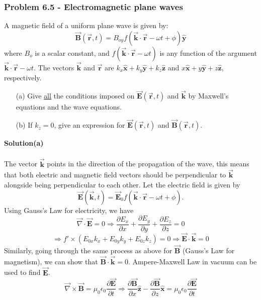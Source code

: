 \documentclass[12pt,a4paper]{article}
\begin{document}
\subsubsection*{Problem 6.5 - Electromagnetic plane waves}
A magnetic field of a uniform plane wave is given by:
\[\boldsymbol{\Vec{B}}(\boldsymbol{\Vec{r}},t)=B_{oy}f(\boldsymbol{\Vec{k}}\cdot\boldsymbol{\Vec{r}}-\omega t+\phi)\boldsymbol{\hat{y}}\]
where $B_o$ is a scalar constant, and $f(\boldsymbol{\Vec{k}}\cdot\boldsymbol{\Vec{r}}-\omega t)$ is any function of the argument $\boldsymbol{\Vec{k}}\cdot\boldsymbol{\Vec{r}}-\omega t$. The
vectors $\boldsymbol{\Vec{k}}$ and $\boldsymbol{\Vec{r}}$ are $k_x\boldsymbol{\hat{x}}+k_y\boldsymbol{\hat{y}}+k_z\boldsymbol{\hat{z}}$ and $x\boldsymbol{\hat{x}}+y\boldsymbol{\hat{y}}+z\boldsymbol{\hat{z}}$, respectively.
\begin{enumerate}
    \item[(a)]Give \underline{all} the conditions imposed on $\boldsymbol{\Vec{E}}(\boldsymbol{\Vec{r}},t)$ and $\boldsymbol{\Vec{k}}$ by Maxwell’s equations and the wave equations.
    \item[(b)]If $k_z=0$, give an expression for $\boldsymbol{\Vec{E}}(\boldsymbol{\Vec{r}},t)$ and $\boldsymbol{\Vec{B}}(\boldsymbol{\Vec{r}},t)$.
\end{enumerate}
\textbf{Solution(a)}
\\
\\The vector $\boldsymbol{\Vec{k}}$ points in the direction of the propagation of the wave, this means that both electric and magnetic field vectors should be perpendicular to $\boldsymbol{\Vec{k}}$ alongside being perpendicular to each other. Let the electric field is given by
\[\boldsymbol{\vec{E}}(\boldsymbol{\Vec{k}},t)=\boldsymbol{\vec{E}}_0f(\boldsymbol{\Vec{k}}\cdot\boldsymbol{\Vec{r}}-\omega t+\phi).\]
Using Gauss's Law for electricity, we have
\[\vec{\nabla}\cdot\boldsymbol{\vec{E}}=0\Rightarrow\frac{\partial E_x}{\partial x}+\frac{\partial E_y}{\partial y}+\frac{\partial E_z}{\partial z}=0\]
\[\Rightarrow f'\times(E_{0x}k_x+E_{0y}k_y+E_{0z}k_z)=0\Rightarrow\boldsymbol{\vec{E}}\cdot\boldsymbol{\vec{k}}=0\]
Similarly, going through the same process as above for $\boldsymbol{\vec{B}}$ (Gauss's Law for magnetism), we can show that $\boldsymbol{\vec{B}}\cdot\boldsymbol{\vec{k}}=0$. 
Ampere-Maxwell Law in vacuum can be used to find $\boldsymbol{\vec{E}}$.
\[\vec{\nabla}\times\boldsymbol{\vec{B}}=\mu_0\epsilon_0\frac{\partial\boldsymbol{\vec{E}}}{\partial t}\Rightarrow\frac{\partial\boldsymbol{\vec{B}}}{\partial x}\boldsymbol{\hat{z}}-\frac{\partial\boldsymbol{\vec{B}}}{\partial z}\boldsymbol{\hat{x}}=\mu_0\epsilon_0\frac{\partial\boldsymbol{\vec{E}}}{\partial t}\]
\end{document}
